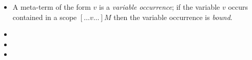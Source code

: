 \documentclass[letterpaper,11pt]{article}
\newcommand{\CK}[1]{\textcolor{blue}{CK: #1}}
\newcommand{\KR}[1]{\textcolor{red}{KR: #1}}
\newcommand{\MS}[1]{\textcolor{violet}{MS: #1}}
\begin{document}
\begin{itemize}

\item A meta-term of the form $v$ is a \emph{variable occurrence}; if the variable $v$ occurs contained
  in a scope $[…v…]M$ then the variable occurrence is \emph{bound}.

\item {}

\item {}

\item {}

\end{itemize}

\end{document}
